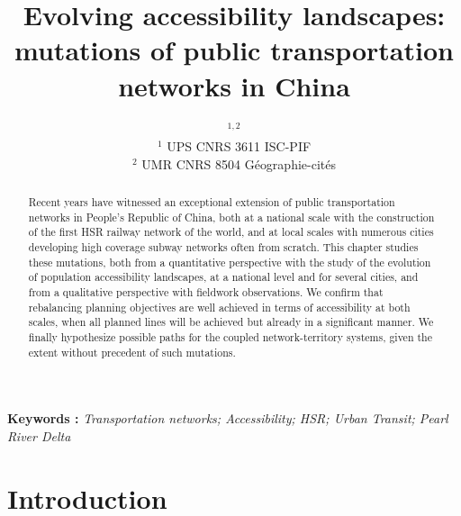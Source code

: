 


\title{Evolving accessibility landscapes: mutations of public transportation networks in China}
\author{$^{1,2}$\\
$^1$ UPS CNRS 3611 ISC-PIF\\
$^2$ UMR CNRS 8504 G{\'e}ographie-cit{\'e}s
}
\date{}


\maketitle

\justify


\begin{abstract}
Recent years have witnessed an exceptional extension of public transportation networks in People's Republic of China, both at a national scale with the construction of the first HSR railway network of the world, and at local scales with numerous cities developing high coverage subway networks often from scratch. This chapter studies these mutations, both from a quantitative perspective with the study of the evolution of population accessibility landscapes, at a national level and for several cities, and from a qualitative perspective with fieldwork observations. We confirm that rebalancing planning objectives are well achieved in terms of accessibility at both scales, when all planned lines will be achieved but already in a significant manner. We finally hypothesize possible paths for the coupled network-territory systems, given the extent without precedent of such mutations.
\end{abstract}

\textbf{Keywords : }\textit{Transportation networks; Accessibility; HSR; Urban Transit; Pearl River Delta}



\section{Introduction}

